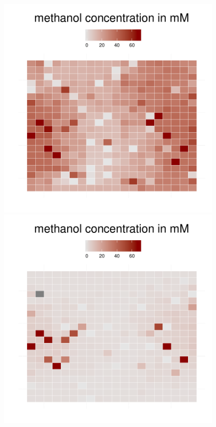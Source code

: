 \begin{figure}[h!]
{\begin{minipage}[t]{0.3\textwidth}
  \end{minipage}
  \begin{minipage}[t]{0.3\textwidth}
    \includegraphics[width=\textwidth]{../results/barkeri_20x20_seed9659_methanol75.pdf}
  \end{minipage}
  \begin{minipage}[t]{0.3\textwidth}
    \includegraphics[width=\textwidth]{../results/barkeri_20x20_seed9659_methanol100a.pdf}

\end{minipage}}
\end{figure}
